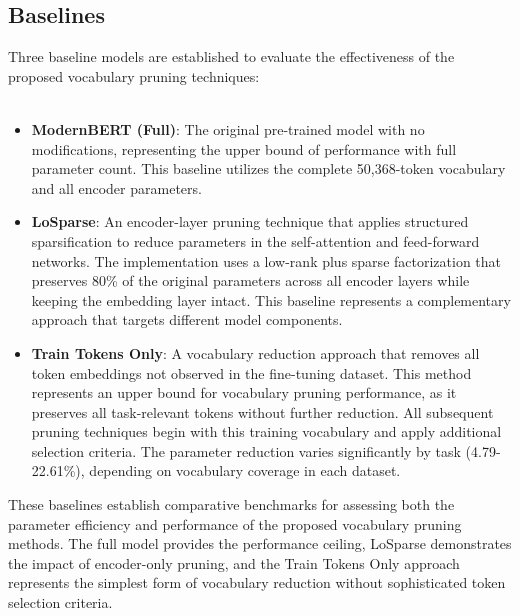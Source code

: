 \documentclass[twocolumn]{article}
\begin{document}
\subsection{Baselines}
Three baseline models are established to evaluate the effectiveness of the proposed vocabulary pruning techniques:
\\ \\
\begin{itemize}
    \item \textbf{ModernBERT (Full)}: The original pre-trained model with no modifications, representing the upper bound of performance with full parameter count. This baseline utilizes the complete 50,368-token vocabulary and all encoder parameters.
    \item \textbf{LoSparse}: An encoder-layer pruning technique that applies structured sparsification to reduce parameters in the self-attention and feed-forward networks. The implementation uses a low-rank plus sparse factorization that preserves 80\% of the original parameters across all encoder layers while keeping the embedding layer intact. This baseline represents a complementary approach that targets different model components.
    \item \textbf{Train Tokens Only}: A vocabulary reduction approach that removes all token embeddings not observed in the fine-tuning dataset. This method represents an upper bound for vocabulary pruning performance, as it preserves all task-relevant tokens without further reduction. All subsequent pruning techniques begin with this training vocabulary and apply additional selection criteria. The parameter reduction varies significantly by task (4.79-22.61\%), depending on vocabulary coverage in each dataset.
\end{itemize}
These baselines establish comparative benchmarks for assessing both the parameter efficiency and performance of the proposed vocabulary pruning methods. The full model provides the performance ceiling, LoSparse demonstrates the impact of encoder-only pruning, and the Train Tokens Only approach represents the simplest form of vocabulary reduction without sophisticated token selection criteria.
\end{document}

